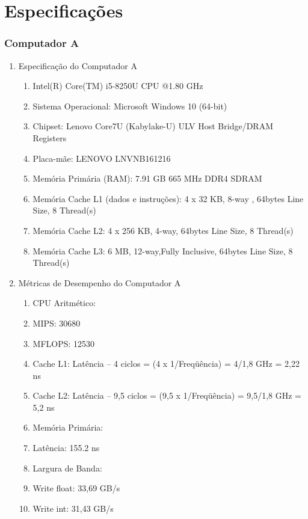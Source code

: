 \section{Especificações\label{section:context}}

\justifying
\noindent
\subsubsection{Computador A}
\begin{enumerate}
    \item
    Especificação do Computador A
    \begin{enumerate}
        \item Intel(R) Core(TM) i5-8250U CPU @1.80 GHz
        \item Sistema Operacional: Microsoft Windows 10 (64-bit)
        \item Chipset: Lenovo Core7U (Kabylake-U) ULV Host Bridge/DRAM Registers
        \item Placa-mãe: LENOVO LNVNB161216
        \item Memória Primária (RAM): 7.91 GB 665 MHz DDR4 SDRAM
        \item Memória Cache L1 (dados e instruções):	4 x 32 KB, 8-way , 64bytes Line Size, 8 Thread(s)
        \item Memória Cache L2: 4 x 256 KB, 4-way, 64bytes Line Size, 8 Thread(s) 
        \item Memória Cache L3: 	6 MB, 12-way,Fully Inclusive, 64bytes Line Size, 8  Thread(s)
    \end{enumerate}
    \vspace{0.5 cm}
    \item
    Métricas de Desempenho do Computador A
    \begin{enumerate}
        \item CPU Aritmético:
        \item MIPS: 30680
        \item MFLOPS: 12530
        \item Cache L1: Latência – 4 ciclos = (4 x 1/Freqüência) = 4/1,8 GHz =  2,22 ns
        \item Cache L2: Latência – 9,5 ciclos = (9,5 x 1/Freqüência) = 9,5/1,8 GHz = 5,2 ns
        \item Memória Primária:
        \item Latência: 155.2 ns
        \item Largura de Banda:
        \item Write float: 33,69 GB/s
        \item Write int: 31,43 GB/s
    \end{enumerate}
        
\end{enumerate}

